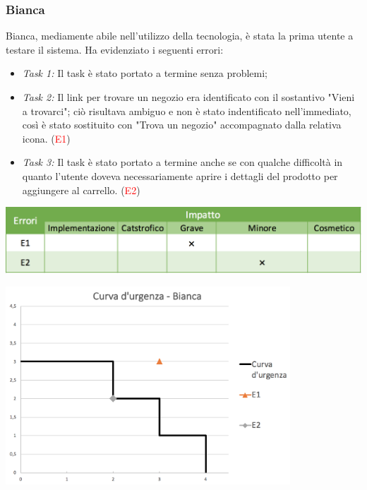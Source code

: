\documentclass[12pt,a4paper]{report}
\begin{document}
  \subsubsection{Bianca}
  Bianca, mediamente abile nell'utilizzo della tecnologia, è stata la prima utente a testare il sistema. Ha evidenziato i seguenti errori:
  \begin{itemize}
    \item \textit{Task 1:} Il task è stato portato a termine senza problemi;
    \item \textit{Task 2:} Il link per trovare un negozio era identificato con il sostantivo "Vieni a trovarci"; ciò risultava ambiguo e non è stato indentificato nell'immediato, così è stato sostituito con "Trova un negozio" accompagnato dalla relativa icona. (\textcolor{red}{E1})
    \item \textit{Task 3:} Il task è stato portato a termine anche se con qualche difficoltà in quanto l'utente doveva necessariamente aprire i dettagli del prodotto per aggiungere al carrello. (\textcolor{red}{E2})
  \end{itemize}
  \includegraphics[width=1\textwidth]{"Project Management Sources/ImpattoBianca"}
  \begin{center}
    \includegraphics[width=0.8\textwidth]{"Project Management Sources/UrgenzaBianca"}
  \end{center}
\end{document}
